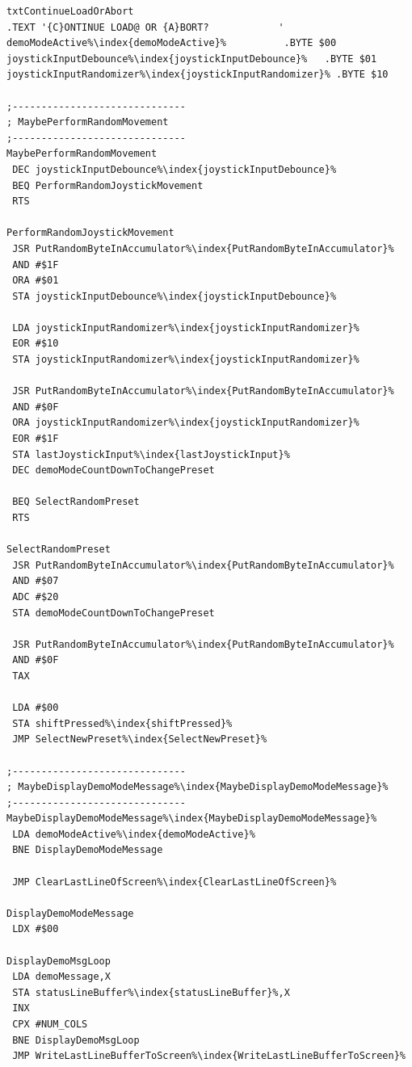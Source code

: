 \begin{minipage}[b]{0.33\linewidth}
\begin{lrbox}{\mybox}%
\begin{lstlisting}[basicstyle=\ttfamily\tiny,escapechar=\%]
txtContinueLoadOrAbort
.TEXT '{C}ONTINUE LOAD@ OR {A}BORT?            '
demoModeActive%\index{demoModeActive}%          .BYTE $00
joystickInputDebounce%\index{joystickInputDebounce}%   .BYTE $01
joystickInputRandomizer%\index{joystickInputRandomizer}% .BYTE $10

;------------------------------
; MaybePerformRandomMovement
;------------------------------
MaybePerformRandomMovement
 DEC joystickInputDebounce%\index{joystickInputDebounce}%
 BEQ PerformRandomJoystickMovement
 RTS

PerformRandomJoystickMovement
 JSR PutRandomByteInAccumulator%\index{PutRandomByteInAccumulator}%
 AND #$1F
 ORA #$01
 STA joystickInputDebounce%\index{joystickInputDebounce}%

 LDA joystickInputRandomizer%\index{joystickInputRandomizer}%
 EOR #$10
 STA joystickInputRandomizer%\index{joystickInputRandomizer}%

 JSR PutRandomByteInAccumulator%\index{PutRandomByteInAccumulator}%
 AND #$0F
 ORA joystickInputRandomizer%\index{joystickInputRandomizer}%
 EOR #$1F
 STA lastJoystickInput%\index{lastJoystickInput}%
 DEC demoModeCountDownToChangePreset

 BEQ SelectRandomPreset
 RTS

SelectRandomPreset
 JSR PutRandomByteInAccumulator%\index{PutRandomByteInAccumulator}%
 AND #$07
 ADC #$20
 STA demoModeCountDownToChangePreset

 JSR PutRandomByteInAccumulator%\index{PutRandomByteInAccumulator}%
 AND #$0F
 TAX

 LDA #$00
 STA shiftPressed%\index{shiftPressed}%
 JMP SelectNewPreset%\index{SelectNewPreset}%

;------------------------------
; MaybeDisplayDemoModeMessage%\index{MaybeDisplayDemoModeMessage}%
;------------------------------
MaybeDisplayDemoModeMessage%\index{MaybeDisplayDemoModeMessage}%
 LDA demoModeActive%\index{demoModeActive}%
 BNE DisplayDemoModeMessage

 JMP ClearLastLineOfScreen%\index{ClearLastLineOfScreen}%

DisplayDemoModeMessage
 LDX #$00

DisplayDemoMsgLoop
 LDA demoMessage,X
 STA statusLineBuffer%\index{statusLineBuffer}%,X
 INX
 CPX #NUM_COLS
 BNE DisplayDemoMsgLoop
 JMP WriteLastLineBufferToScreen%\index{WriteLastLineBufferToScreen}%


\end{lstlisting}
\end{lrbox}
\end{minipage}
